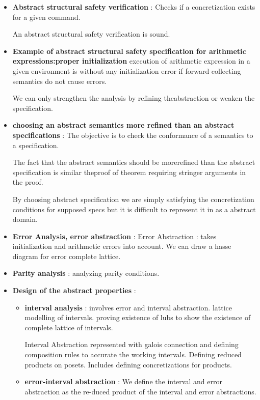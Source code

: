 \begin{itemize}
	\item{\textbf{Abstract structural safety verification} : Checks if a concretization exists for a given command.

	An abstract structural safety verification is sound.
	}

	\item{\textbf{Example of abstract structural safety specification for arithmetic expressions:proper initialization } execution of arithmetic expression in a given environment is without any initialization error if forward collecting semantics do not cause errors.

	We can only strengthen the analysis by refining theabstraction or weaken the specification.
	}

	\item{\textbf{choosing an abstract semantics more refined than an abstract specifications} :
	The objective is to check the conformance of a semantics to a specification.

	The fact that the abstract semantics should be morerefined than the abstract specification is similar theproof of theorem requiring stringer arguments in the proof.

	By choosing abstract specification we are simply satisfying the concretization conditions for supposed specs but it is difficult to represent it in as a abstract domain.
	}

	\item{\textbf{Error Analysis, error abstraction} : 
	Error Abstraction :  takes initialization and arithmetic errors into account. We can draw a hasse diagram for error complete lattice.
	}

	\item{\textbf{Parity analysis} : analyzing parity conditions.
	}

	\item{\textbf{Design of the abstract properties} :
	
	\begin{itemize}
		\item{\textbf{interval analysis} : involves error and interval abstraction. lattice modelling of intervals. proving existence of lubs to show the existence of complete lattice of intervals.

		Interval Abstraction represented with galois connection and defining composition rules to accurate the working intervals. Defining reduced products on posets. Includes defining concretizations for products.
		}

		\item{\textbf{error-interval abstraction} :
		We define the interval and error abstraction as the re-duced product of the interval and error abstractions.

}
\end{itemize}}
\end{itemize}
